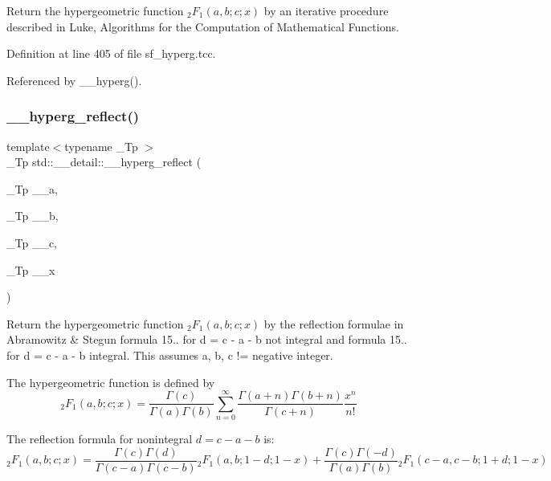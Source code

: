 Return the hypergeometric function $ {}_2F_1(a,b;c;x) $ by an iterative procedure described in Luke, Algorithms for the Computation of Mathematical Functions. 



Definition at line 405 of file sf\+\_\+hyperg.\+tcc.



Referenced by \+\_\+\+\_\+hyperg().

\mbox{\label{namespacestd_1_1____detail_a3c3baddc93bfaf1cb368d4b74e53542d}} 
\subsubsection{\texorpdfstring{\+\_\+\+\_\+hyperg\+\_\+reflect()}{\_\_hyperg\_reflect()}}
{\footnotesize\ttfamily template$<$typename \+\_\+\+Tp $>$ \\
\+\_\+\+Tp std\+::\+\_\+\+\_\+detail\+::\+\_\+\+\_\+hyperg\+\_\+reflect (\begin{DoxyParamCaption}\item[{\+\_\+\+Tp}]{\+\_\+\+\_\+a,  }\item[{\+\_\+\+Tp}]{\+\_\+\+\_\+b,  }\item[{\+\_\+\+Tp}]{\+\_\+\+\_\+c,  }\item[{\+\_\+\+Tp}]{\+\_\+\+\_\+x }\end{DoxyParamCaption})}



Return the hypergeometric function $ {}_2F_1(a,b;c;x) $ by the reflection formulae in Abramowitz \& Stegun formula 15.. for d = c -\/ a -\/ b not integral and formula 15.. for d = c -\/ a -\/ b integral. This assumes a, b, c != negative integer. 

The hypergeometric function is defined by \[ {}_2F_1(a,b;c;x) = \frac{\Gamma(c)}{\Gamma(a)\Gamma(b)} \sum_{n=0}^{\infty} \frac{\Gamma(a+n)\Gamma(b+n)}{\Gamma(c+n)} \frac{x^n}{n!} \]

The reflection formula for nonintegral $ d = c - a - b $ is\+: \[ {}_2F_1(a,b;c;x) = \frac{\Gamma(c)\Gamma(d)}{\Gamma(c-a)\Gamma(c-b)} {}_2F_1(a,b;1-d;1-x) + \frac{\Gamma(c)\Gamma(-d)}{\Gamma(a)\Gamma(b)} {}_2F_1(c-a,c-b;1+d;1-x) \]

